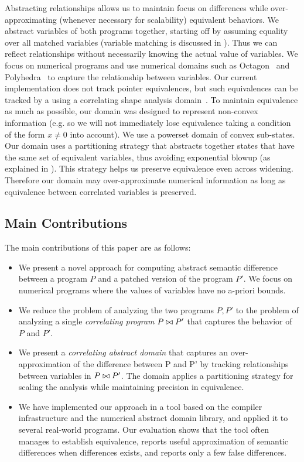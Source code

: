 Abstracting relationships allows us to maintain focus on differences while over-approximating (whenever necessary for scalability) equivalent behaviors. We abstract variables of both programs together, starting off by assuming equality over all matched variables (variable matching is discussed in ). Thus we can
reflect relationships without necessarily knowing the actual value of
variables. We focus on numerical programs and use numerical domains such as Octagon~\cite{Mine2006} and Polyhedra~\cite{CousotHalbwachs78} to capture the relationship between variables. Our current implementation does not track pointer equivalences, but such equivalences can be tracked by a using a correlating shape analysis domain~\cite{AmitRinetzkyRepsSagivYahav07}. To maintain equivalence as much as possible, our domain was designed to represent non-convex information (e.g. so we will not immediately lose equivalence taking a condition of the form $x \neq 0$ into account). We use a powerset domain of convex sub-states. Our domain uses a partitioning strategy that abstracts together states that have the same set of equivalent variables, thus avoiding exponential blowup (as explained in ). This strategy helps us preserve equivalence even across widening. Therefore our domain may over-approximate numerical information as long as equivalence between correlated variables is preserved.

\subsection{Main Contributions}
The main contributions of this paper are as follows:
\begin{itemize}
\item We present a novel approach for computing abstract semantic difference between a program $P$ and a patched version of the program $P'$. We focus on numerical programs where the values of variables have no a-priori bounds.
\item We reduce the problem of analyzing the two programs $P,P'$ to the problem of analyzing a single \emph{correlating program} $P \bowtie P'$ that captures the behavior of $P$ and $P'$.
\item We present a \emph{correlating abstract domain} that captures an over-approximation of the difference between P and P' by tracking relationships between variables in $P \bowtie P'$. The domain applies a partitioning strategy for scaling the analysis while maintaining precision in equivalence.
\item We have implemented our approach in a tool based on the  compiler infrastructure and the  numerical abstract domain library, and applied it to several real-world programs. Our evaluation shows that the tool often manages to establish equivalence, reports useful approximation of semantic differences when differences exists, and reports only a few false differences.
\end{itemize}

